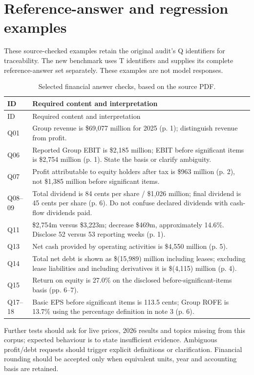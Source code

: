 \documentclass[11pt,a4paper]{article}
\renewcommand{\arraystretch}{1.17}
\begin{document}
\section{Reference-answer and regression examples}
\begingroup\small\renewcommand{\arraystretch}{1.05}
These source-checked examples retain the original audit's Q identifiers for traceability. The new benchmark uses T identifiers and supplies its complete reference-answer set separately. These examples are not model responses.
\begin{longtable}{p{15mm}p{119mm}}
\caption{Selected financial answer checks, based on the source PDF.}\\
\toprule ID & Required content and interpretation\\\midrule\endfirsthead
\toprule ID & Required content and interpretation\\\midrule\endhead
Q01 & Group revenue is \$69,077 million for 2025 (p. 1); distinguish revenue from profit.\\
Q06 & Reported Group EBIT is \$2,185 million; EBIT before significant items is \$2,754 million (p. 1). State the basis or clarify ambiguity.\\
Q07 & Profit attributable to equity holders after tax is \$963 million (p. 2), not \$1,385 million before significant items.\\
Q08--09 & Total dividend is 84 cents per share / \$1,026 million; final dividend is 45 cents per share (p. 6). Do not confuse declared dividends with cash-flow dividends paid.\\
Q11 & \$2,754m versus \$3,223m; decrease \$469m, approximately 14.6\%. Disclose 52 versus 53 reporting weeks (p. 1).\\
Q13 & Net cash provided by operating activities is \$4,550 million (p. 5).\\
Q14 & Total net debt is shown as \$(15,989) million including leases; excluding lease liabilities and including derivatives it is \$(4,115) million (p. 4).\\
Q15 & Return on equity is 27.0\% on the disclosed before-significant-items basis (pp. 6--7).\\
Q17--18 & Basic EPS before significant items is 113.5 cents; Group ROFE is 13.7\% using the percentage definition in note 3 (p. 6).\\\bottomrule
\end{longtable}
Further tests should ask for live prices, 2026 results and topics missing from this corpus; expected behaviour is to state insufficient evidence. Ambiguous profit/debt requests should trigger explicit definitions or clarification. Financial rounding should be accepted only when equivalent units, year and accounting basis are retained.
\end{document}
